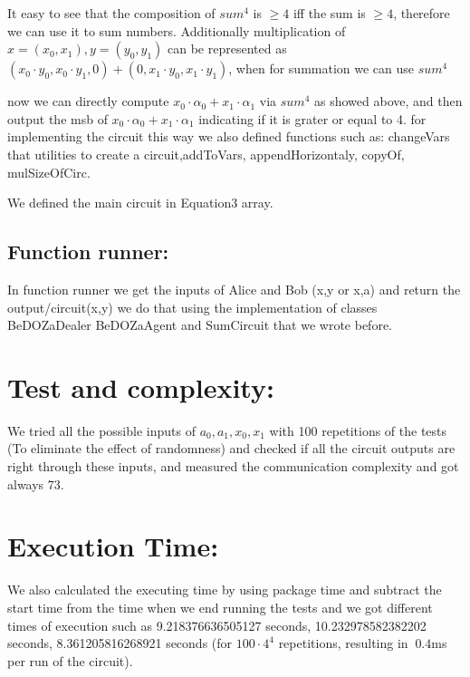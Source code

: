\documentclass{article}
\begin{document}
It easy to see that the composition of $sum^{4}$ is $\geq 4$ iff the sum is $\geq 4$, therefore we can use it to sum numbers. Additionally multiplication of $x=(x_0,x_1),y=(y_0,y_1)$ can be represented as $(x_0\cdot y_0,x_0\cdot y_1,0) + (0,x_1\cdot y_0,x_1\cdot y_1)$, when for summation we can use $sum^{4}$

now we can directly compute $x_0\cdot \alpha_0 + x_1 \cdot \alpha_1$ via $sum^{4}$ as showed above, and then output the msb of $x_0\cdot \alpha_0 + x_1 \cdot \alpha_1$ indicating if it is grater or equal to 4.
for implementing the circuit this way we also defined functions such as: changeVars that utilities to create a circuit,addToVars, appendHorizontaly, copyOf, mulSizeOfCirc.

We defined the main circuit in Equation3 array.
\subsection*{Function runner:}
In function runner we get the inputs of Alice and Bob (x,y or x,a) and return the output/circuit(x,y) we do that using the implementation of classes BeDOZaDealer BeDOZaAgent and SumCircuit that we wrote before.
\section*{Test and complexity:}
We tried all the possible inputs of $a_0,a_1,x_0,x_1$ with 100 repetitions of the tests (To eliminate the effect of randomness) and checked if all the circuit outputs are right through these inputs, and measured the communication complexity and got always 73.
\section*{Execution Time:}
We also calculated the executing time by using package time and subtract the start time from the time when we end running the tests and we got different times of execution such as 9.218376636505127 seconds, 10.232978582382202 seconds, 8.361205816268921 seconds (for $100 \cdot 4^4$ repetitions, resulting in $~0.4$ms per run of the circuit). 
\end{document}
